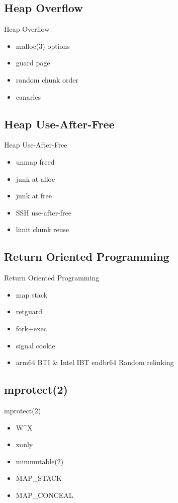\documentclass[14pt,aspectratio=169]{beamer}
\begin{document}
\subsection{Heap Overflow}
\begin{frame}{Heap Overflow}
\begin{itemize}
  \item malloc(3) options
  \item guard page
  \item random chunk order
  \item canaries
\end{itemize}
\end{frame}

\subsection{Heap Use-After-Free}
\begin{frame}{Heap Use-After-Free}
\begin{itemize}
  \item unmap freed
  \item junk at alloc
  \item junk at free
  \item SSH use-after-free
  \item limit chunk reuse
\end{itemize}
\end{frame}

\subsection{Return Oriented Programming}
\begin{frame}{Return Oriented Programming}
\begin{itemize}
  \item map stack
  \item retguard
  \item fork+exec
  \item signal cookie
  \item arm64 BTI \& Intel IBT endbr64
Random relinking
\end{itemize}
\end{frame}

\subsection{mprotect(2)}
\begin{frame}{mprotect(2)}
\begin{itemize}
  \item W\^{}X
  \item xonly
  \item mimmutable(2)
  \item MAP\_STACK
  \item MAP\_CONCEAL
\end{itemize}
\end{frame}
\end{document}
